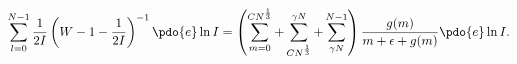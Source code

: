 \begin{equation}
\label{Eq_A38}
\sum^{N-1}_{l=0} \frac{1}{2I}
  \left( W - 1 - \frac{1}{2I} \right)^{-1} \pdo{e} \ln I
  =
  \left(
  \sum^{CN^{\frac{1}{3}}}_{m=0}
  + \sum^{\gamma N}_{CN^{\frac{1}{3}}}
  + \sum^{N-1}_{\gamma N}
  \right)
  \frac{g(m)}{m + \epsilon + g(m)} \pdo{e} \ln I.
\end{equation}

